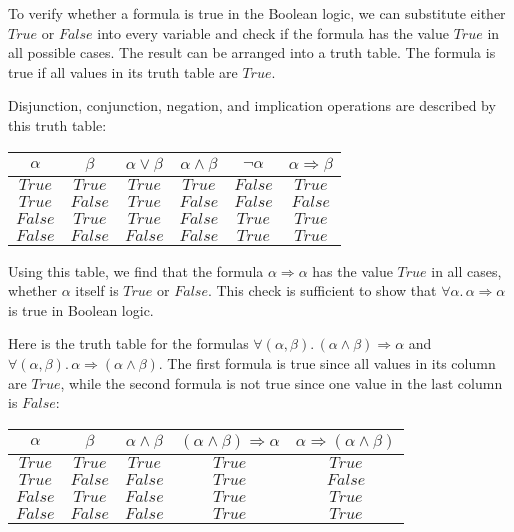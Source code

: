 To verify whether a formula is true in the Boolean logic, we can substitute
either $True$ or $False$ into every variable and check if the formula
has the value $True$ in all possible cases. The result can be arranged
into a truth table. The formula is true if all
values in its truth table are $True$.

Disjunction, conjunction, negation, and implication operations are
described by this  truth table:
\begin{center}
{\small{}}%
\begin{tabular}{|c|c|c|c|c|c|}
\hline 
{\small{}$\alpha$} & {\small{}$\beta$} & \textbf{\small{}$\alpha\vee\beta$} & \textbf{\small{}$\alpha\wedge\beta$} & \textbf{\small{}$\neg\alpha$} & \textbf{\small{}$\alpha\Rightarrow\beta$}\tabularnewline
\hline 
\hline 
{\small{}$True$} & {\small{}$True$} & {\small{}$True$} & {\small{}$True$} & {\small{}$False$} & {\small{}$True$}\tabularnewline
\hline 
{\small{}$True$} & {\small{}$False$} & {\small{}$True$} & {\small{}$False$} & {\small{}$False$} & {\small{}$False$}\tabularnewline
\hline 
{\small{}$False$} & {\small{}$True$} & {\small{}$True$} & {\small{}$False$} & {\small{}$True$} & {\small{}$True$}\tabularnewline
\hline 
{\small{}$False$} & {\small{}$False$} & {\small{}$False$} & {\small{}$False$} & {\small{}$True$} & {\small{}$True$}\tabularnewline
\hline 
\end{tabular}{\small\par}
\par\end{center}

Using this table, we find that the formula $\alpha\Rightarrow\alpha$
has the value $True$ in all cases, whether $\alpha$ itself is $True$
or $False$. This check is sufficient to show that $\forall\alpha.\,\alpha\Rightarrow\alpha$
is true in Boolean logic.

Here is the truth table for the formulas $\forall(\alpha,\beta).\,(\alpha\wedge\beta)\Rightarrow\alpha$
and $\forall(\alpha,\beta).\,\alpha\Rightarrow(\alpha\wedge\beta)$.
The first formula is true since all values in its column are $True$,
while the second formula is not true since one value in the last column
is $False$:
\begin{center}
{\small{}}%
\begin{tabular}{|c|c|c|c|c|}
\hline 
{\small{}$\alpha$} & {\small{}$\beta$} & \textbf{\small{}$\alpha\wedge\beta$} & {\small{}$(\alpha\wedge\beta)\Rightarrow\alpha$} & {\small{}$\alpha\Rightarrow(\alpha\wedge\beta)$}\tabularnewline
\hline 
\hline 
{\small{}$True$} & {\small{}$True$} & {\small{}$True$} & {\small{}$True$} & {\small{}$True$}\tabularnewline
\hline 
{\small{}$True$} & {\small{}$False$} & {\small{}$False$} & {\small{}$True$} & {\small{}$False$}\tabularnewline
\hline 
{\small{}$False$} & {\small{}$True$} & {\small{}$False$} & {\small{}$True$} & {\small{}$True$}\tabularnewline
\hline 
{\small{}$False$} & {\small{}$False$} & {\small{}$False$} & {\small{}$True$} & {\small{}$True$}\tabularnewline
\hline 
\end{tabular}{\small\par}
\par\end{center}


